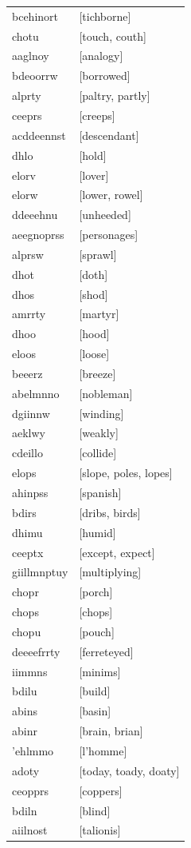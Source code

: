 \documentclass{article}
\begin{document}
\begin{tabular}{ll}
bcehinort & [tichborne] \\
chotu & [touch, couth] \\
aaglnoy & [analogy] \\
bdeoorrw & [borrowed] \\
alprty & [paltry, partly] \\
ceeprs & [creeps] \\
acddeennst & [descendant] \\
dhlo & [hold] \\
elorv & [lover] \\
elorw & [lower, rowel] \\
ddeeehnu & [unheeded] \\
aeegnoprss & [personages] \\
alprsw & [sprawl] \\
dhot & [doth] \\
dhos & [shod] \\
amrrty & [martyr] \\
dhoo & [hood] \\
eloos & [loose] \\
beeerz & [breeze] \\
abelmnno & [nobleman] \\
dgiinnw & [winding] \\
aeklwy & [weakly] \\
cdeillo & [collide] \\
elops & [slope, poles, lopes] \\
ahinpss & [spanish] \\
bdirs & [dribs, birds] \\
dhimu & [humid] \\
ceeptx & [except, expect] \\
giillmnptuy & [multiplying] \\
chopr & [porch] \\
chops & [chops] \\
chopu & [pouch] \\
deeeefrrty & [ferreteyed] \\
iimmns & [minims] \\
bdilu & [build] \\
abins & [basin] \\
abinr & [brain, brian] \\
'ehlmmo & [l'homme] \\
adoty & [today, toady, doaty] \\
ceopprs & [coppers] \\
bdiln & [blind] \\
aiilnost & [talionis] \\

\end{tabular}
\end{document}

